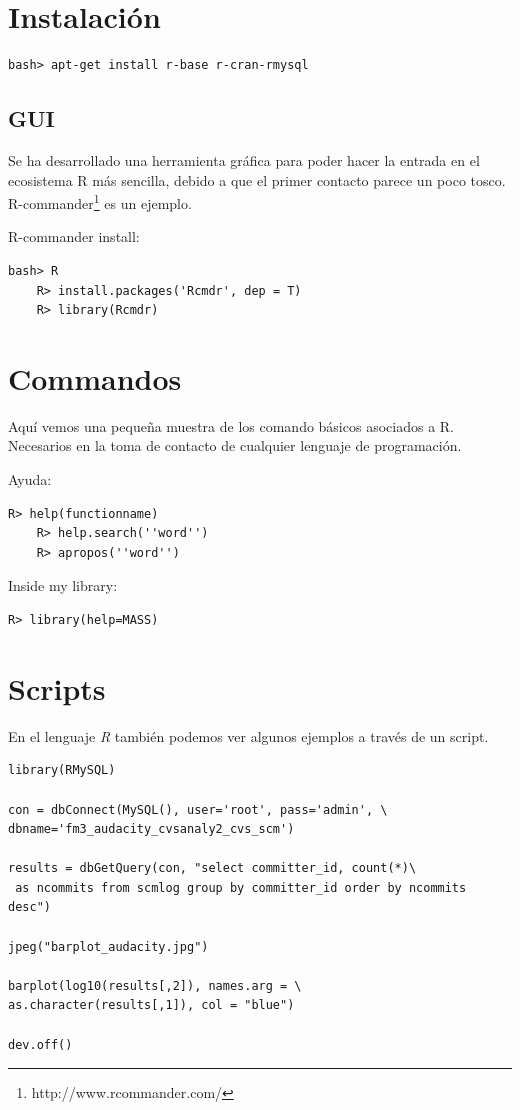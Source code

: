 \documentclass[11pt]{scrartcl}
\begin{document}
\section{Instalaci\'on}

\begin{lstlisting}[style=Shell]
	bash> apt-get install r-base r-cran-rmysql
\end{lstlisting}

\subsection{GUI}

Se ha desarrollado una herramienta gr\'afica para poder hacer la entrada en el ecosistema R m\'as sencilla, debido a que el primer contacto parece un poco tosco. R-commander\footnote{http://www.rcommander.com/} es un ejemplo.

R-commander install:

\begin{lstlisting}[style=Shell]
	bash> R
	R> install.packages('Rcmdr', dep = T)
	R> library(Rcmdr)
\end{lstlisting}

\section{Commandos}

Aqu\'i vemos una peque\~na muestra de los comando b\'asicos asociados a R. Necesarios en la toma de contacto de cualquier lenguaje de programaci\'on.

Ayuda:

\begin{lstlisting}[style=Shell]
	R> help(functionname)
	R> help.search(''word'')
	R> apropos(''word'')
\end{lstlisting}

Inside my library:

\begin{lstlisting}[style=Shell]
	R> library(help=MASS)
\end{lstlisting}

\section{Scripts}

En el lenguaje \emph{R} tambi\'en podemos ver algunos ejemplos a través de un script.

\begin{lstlisting}
library(RMySQL)

con = dbConnect(MySQL(), user='root', pass='admin', \
dbname='fm3_audacity_cvsanaly2_cvs_scm')

results = dbGetQuery(con, "select committer_id, count(*)\
 as ncommits from scmlog group by committer_id order by ncommits desc")

jpeg("barplot_audacity.jpg")

barplot(log10(results[,2]), names.arg = \
as.character(results[,1]), col = "blue")

dev.off()
\end{lstlisting}
\end{document}

